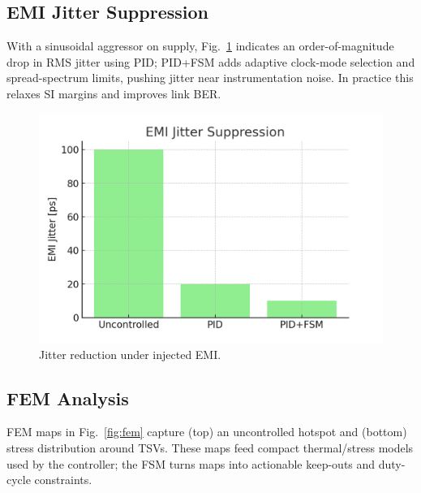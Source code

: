 \documentclass[conference]{IEEEtran}
\begin{document}
\subsection{EMI Jitter Suppression}
With a sinusoidal aggressor on supply, Fig.~\ref{fig:emi} indicates an order-of-magnitude drop in RMS jitter using PID; PID+FSM adds adaptive clock-mode selection and spread-spectrum limits, pushing jitter near instrumentation noise. In practice this relaxes SI margins and improves link BER.

\begin{figure}[t]
\centering
\includegraphics[width=0.95\linewidth]{figs/sim_emi_jitter.png}
\caption{Jitter reduction under injected EMI.}
\label{fig:emi}
\end{figure}

\subsection{FEM Analysis}
FEM maps in Fig.~\ref{fig:fem} capture (top) an uncontrolled hotspot and (bottom) stress distribution around TSVs. These maps feed compact thermal/stress models used by the controller; the FSM turns maps into actionable keep-outs and duty-cycle constraints.
\end{document}
